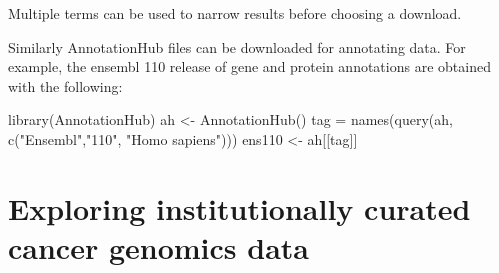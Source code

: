 \documentclass[]{article}
\newcommand{\hlstr}[1]{\textcolor[rgb]{0.251,0.627,0.251}{#1}}%
\newcommand{\hlcom}[1]{\textcolor[rgb]{0.502,0.502,0.502}{\textit{#1}}}%
\newcommand{\hlstd}[1]{\textcolor[rgb]{0.251,0.251,0.251}{#1}}%
\newcommand{\hlkwd}[1]{\textcolor[rgb]{0.878,0.439,0.125}{#1}}%
\newenvironment{Shaded}{\begin{myshaded}}{\end{myshaded}}
\newcommand{\KeywordTok}[1]{\hlkwd{#1}}
\newcommand{\StringTok}[1]{\hlstr{#1}}
\newcommand{\CommentTok}[1]{\hlcom{#1}}
\newcommand{\NormalTok}[1]{\hlstd{#1}}
\begin{document}
Multiple terms can be used to narrow results before choosing a download.

\begin{Shaded}
\end{Shaded}

Similarly AnnotationHub files can be downloaded for annotating data. For example,
the ensembl 110 release of gene and protein annotations are obtained with the
following:

\begin{Shaded}
\begin{Highlighting}[]
\KeywordTok{library}\NormalTok{(AnnotationHub)}
\NormalTok{ah \textless{}{-}}\StringTok{ }\KeywordTok{AnnotationHub}\NormalTok{()}
\NormalTok{tag =}\StringTok{ }\KeywordTok{names}\NormalTok{(}\KeywordTok{query}\NormalTok{(ah, }\KeywordTok{c}\NormalTok{(}\StringTok{"Ensembl"}\NormalTok{,}\StringTok{"110"}\NormalTok{, }\StringTok{"Homo sapiens"}\NormalTok{)))}
\NormalTok{ens110 \textless{}{-}}\StringTok{ }\NormalTok{ah[[tag]]}
\end{Highlighting}
\end{Shaded}

\hypertarget{exploring-institutionally-curated-cancer-genomics-data}{%
\section{Exploring institutionally curated cancer genomics data}\label{exploring-institutionally-curated-cancer-genomics-data}}
\end{document}
